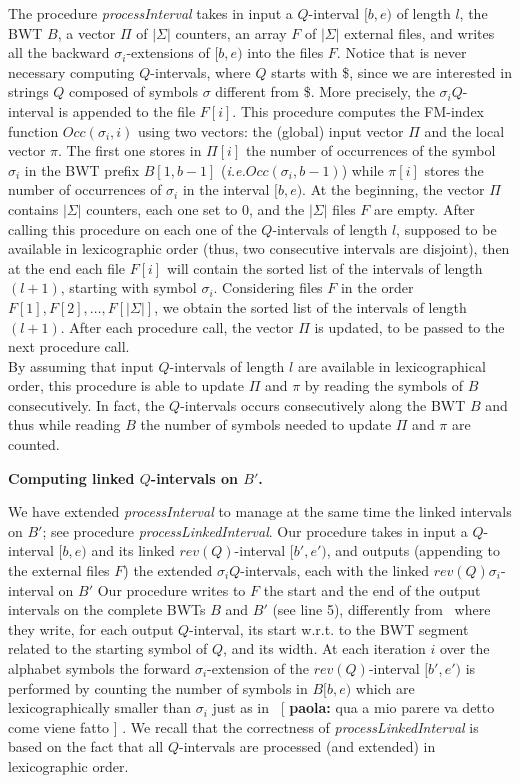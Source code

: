 \documentclass[runningheads,envcountsame,a4paper]{llncs}
\newcommand{\notaestesa}[2]{%
 \marginpar{\color{red!75!black}\textbf{\texttimes}}%
 {\color{red!75!black}%
 [\,\textbullet\,\textsf{\textbf{#1:}} %
 \textsf{\footnotesize#2}\,\textbullet\,]}%
}
\newcommand{\ie}{\textit{i.e.}\xspace}
\newcommand{\wrt}{w.r.t.\xspace}
\begin{document}
The procedure \emph{processInterval} takes in input a $Q$-interval $[b,e)$ of
length $l$, the BWT $B$, a vector $\Pi$ of $|\Sigma|$ counters, an array $F$ of
$|\Sigma|$ external files, and writes all the backward $\sigma_i$-extensions of
$[b,e)$ into the files $F$. Notice that is never necessary computing $Q$-intervals, where $Q$ starts with \$, since we are interested in strings $Q$ composed of symbols $\sigma$ different from \$.
More precisely, the $\sigma_i Q$-interval is appended to the file $F[i]$.
This procedure computes the FM-index function $Occ(\sigma_i, i)$ using two
vectors: the (global) input vector $\Pi$ and the local vector $\pi$.
The first one stores in $\Pi[i]$ the number of occurrences of  the symbol
$\sigma_i$ in the BWT prefix $B[1,b-1]$ (\ie $Occ(\sigma_{i}, b-1)$) while $\pi[i]$ stores the number of occurrences of $\sigma_i$ in the interval $[b,e)$. At the beginning, the vector $\Pi$ contains $|\Sigma|$ counters, each one set to $0$, and the $|\Sigma|$ files $F$ are empty.
After calling this procedure on each one of the $Q$-intervals of length $l$, supposed to be available in lexicographic order (thus, two consecutive intervals are disjoint), then  at the end each file $F[i]$ will contain the sorted list of the intervals of length $(l+1)$, starting with symbol $\sigma_i$. Considering files $F$ in the order $F[1], F[2], \ldots ,F[|\Sigma|]$, we obtain the sorted list of the intervals of length $(l+1)$. After each procedure call, the vector $\Pi$ is updated, to be passed to the next procedure call.\\
By assuming that input $Q$-intervals of length $l$ are available in lexicographical order, this procedure is able to update $\Pi$ and $\pi$ by reading the symbols of $B$ consecutively.
In fact, the $Q$-intervals occurs consecutively along the BWT $B$ and  thus while reading $B$ the number of symbols needed to update $\Pi$ and $\pi$ are counted.

\noindent
{\bf Computing  linked $Q$-intervals on $B'$.}

We have extended \emph{processInterval} to manage at the same time  the linked intervals on
$B'$; see procedure \emph{processLinkedInterval}.
Our procedure takes in input a $Q$-interval $[b,e)$ and its linked
$rev(Q)$-interval $[b',e')$, and outputs (appending to the external files $F$)
the extended $\sigma_i Q$-intervals, each  with the linked $rev(Q)
\sigma_i$-interval on $B'$
Our procedure writes to $F$ the start and the end of the output intervals on the
complete BWTs $B$ and $B'$ (see line 5), differently from~\cite{Cox2012} where they write, for each output $Q$-interval, its start \wrt to the BWT segment related to the starting symbol of $Q$, and its width.
At each iteration $i$ over the alphabet symbols the forward $\sigma_i$-extension
of the $rev(Q)$-interval $[b',e')$ is performed by counting
the number of symbols in $B[b,e)$ which are lexicographically smaller than
$\sigma_i$ just as in~\cite{Simpson2010}  \notaestesa{paola}{qua a mio parere va detto come viene fatto}.
We recall that the correctness of \emph{processLinkedInterval} is based on the
fact that all $Q$-intervals are processed (and extended) in lexicographic order.
\end{document}
